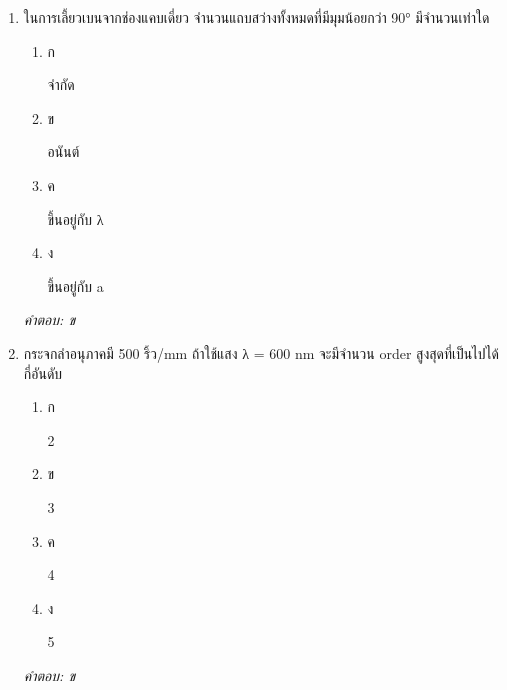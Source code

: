 \documentclass[12pt]{article}
\begin{document}
\begin{enumerate}[label=\arabic*., itemsep=0.5\baselineskip, topsep=0.5\baselineskip, leftmargin=*]
\item ในการเลี้ยวเบนจากช่องแคบเดี่ยว จำนวนแถบสว่างทั้งหมดที่มีมุมน้อยกว่า 90° มีจำนวนเท่าใด
\begin{enumerate}[label=\alph*)., itemsep=0.3\baselineskip, topsep=0.3\baselineskip]
\item ก\ 
\begin{minipage}[t]{0.9\linewidth}
\raggedright จำกัด
\end{minipage}
\item ข\ 
\begin{minipage}[t]{0.9\linewidth}
\raggedright อนันต์
\end{minipage}
\item ค\ 
\begin{minipage}[t]{0.9\linewidth}
\raggedright ขึ้นอยู่กับ λ
\end{minipage}
\item ง\ 
\begin{minipage}[t]{0.9\linewidth}
\raggedright ขึ้นอยู่กับ a
\end{minipage}
\end{enumerate}
\vspace{-0.3\baselineskip}
\begin{small}
\textit{คำตอบ: ข}
\end{small}

\item กระจกลำอนุภาคมี 500 ริ้ว/mm ถ้าใช้แสง λ = 600 nm จะมีจำนวน order สูงสุดที่เป็นไปได้กี่อันดับ
\begin{enumerate}[label=\alph*)., itemsep=0.3\baselineskip, topsep=0.3\baselineskip]
\item ก\ 
\begin{minipage}[t]{0.9\linewidth}
\raggedright 2
\end{minipage}
\item ข\ 
\begin{minipage}[t]{0.9\linewidth}
\raggedright 3
\end{minipage}
\item ค\ 
\begin{minipage}[t]{0.9\linewidth}
\raggedright 4
\end{minipage}
\item ง\ 
\begin{minipage}[t]{0.9\linewidth}
\raggedright 5
\end{minipage}
\end{enumerate}
\vspace{-0.3\baselineskip}
\begin{small}
\textit{คำตอบ: ข}
\end{small}


\end{enumerate}
\end{document}

